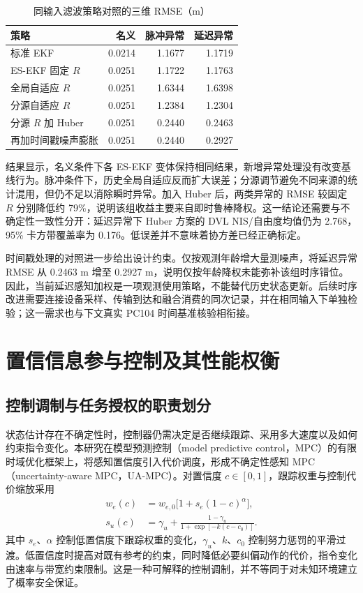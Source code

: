 \begin{table}[htbp]
\centering
\caption{同输入滤波策略对照的三维 RMSE（m）}\label{tab:middle-filter-results}
\begin{tabular}{@{}lrrr@{}}
\toprule
策略 & 名义 & 脉冲异常 & 延迟异常 \\
\midrule
标准 EKF & 0.0214 & 1.1677 & 1.1719 \\
ES-EKF 固定 $R$ & 0.0251 & 1.1722 & 1.1763 \\
全局自适应 $R$ & 0.0251 & 1.6344 & 1.6398 \\
分源自适应 $R$ & 0.0251 & 1.2384 & 1.2304 \\
分源 $R$ 加 Huber & 0.0251 & 0.2440 & 0.2463 \\
再加时间戳噪声膨胀 & 0.0251 & 0.2440 & 0.2927 \\
\bottomrule
\end{tabular}
\end{table}

结果显示，名义条件下各 ES-EKF 变体保持相同结果，新增异常处理没有改变基线行为。脉冲条件下，历史全局自适应反而扩大误差；分源调节避免不同来源的统计混用，但仍不足以消除瞬时异常。加入 Huber 后，两类异常的 RMSE 较固定 $R$ 分别降低约 79\%，说明该组收益主要来自即时鲁棒降权。这一结论还需要与不确定性一致性分开：延迟异常下 Huber 方案的 DVL NIS/自由度均值仍为 2.768，95\% 卡方带覆盖率为 0.176。低误差并不意味着协方差已经正确标定。

时间戳处理的对照进一步给出设计约束。仅按观测年龄增大量测噪声，将延迟异常 RMSE 从 0.2463 m 增至 0.2927 m，说明仅按年龄降权未能弥补该组时序错位。因此，当前延迟感知加权是一项观测使用策略，不能替代历史状态更新。后续时序改进需要连接设备采样、传输到达和融合消费的同次记录，并在相同输入下单独检验；这一需求也与下文真实 PC104 时间基准核验相衔接。

\section{置信信息参与控制及其性能权衡}\label{sec:middle-control}

\subsection{控制调制与任务授权的职责划分}

状态估计存在不确定性时，控制器仍需决定是否继续跟踪、采用多大速度以及如何约束指令变化。本研究在模型预测控制（model predictive control，MPC）的有限时域优化框架\cite{mayne2000constrained}上，将感知置信度引入代价调度，形成不确定性感知 MPC（uncertainty-aware MPC，UA-MPC）。对置信度 $c\in[0,1]$，跟踪权重与控制代价缩放采用
\begin{equation}
\begin{aligned}
 w_e(c)&=w_{e,0}\bigl[1+s_e(1-c)^{\alpha}\bigr],\\
 s_u(c)&=\gamma_u+\frac{1-\gamma_u}{1+\exp[-k(c-c_0)]}.
\end{aligned}
\end{equation}
其中 $s_e$、$\alpha$ 控制低置信度下跟踪权重的变化，$\gamma_u$、$k$、$c_0$ 控制努力惩罚的平滑过渡。低置信度时提高对既有参考的约束，同时降低必要纠偏动作的代价，指令变化由速率与带宽约束限制。这是一种可解释的控制调制，并不等同于对未知环境建立了概率安全保证。

